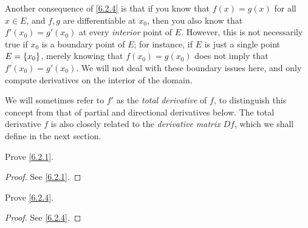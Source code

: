 \begin{note}
  Another consequence of \cref{6.2.4} is that if you know that \(f(x) = g(x)\) for all \(x \in E\), and \(f, g\) are differentiable at \(x_0\), then you also know that \(f'(x_0) = g'(x_0)\) at every \emph{interior} point of \(E\).
  However, this is not necessarily true if \(x_0\) is a boundary point of \(E\);
  for instance, if \(E\) is just a single point \(E = \left\lbrace x_0\right\rbrace\), merely knowing that \(f(x_0) = g(x_0)\) does not imply that \(f'(x_0) = g'(x_0)\).
  We will not deal with these boundary issues here, and only compute derivatives on the interior of the domain.
\end{note}

\begin{note}
  We will sometimes refer to \(f'\) as the \emph{total derivative} of \(f\), to distinguish this concept from that of partial and directional derivatives below.
  The total derivative \(f\) is also closely related to the \emph{derivative matrix} \(Df\),
  which we shall define in the next section.
\end{note}

\exercisesection

\begin{ex}\label{ex:6.2.1}
  Prove \cref{6.2.1}.
\end{ex}

\begin{proof}
  See \cref{6.2.1}.
\end{proof}

\begin{ex}\label{ex:6.2.2}
  Prove \cref{6.2.4}.
\end{ex}

\begin{proof}
  See \cref{6.2.4}.
\end{proof}